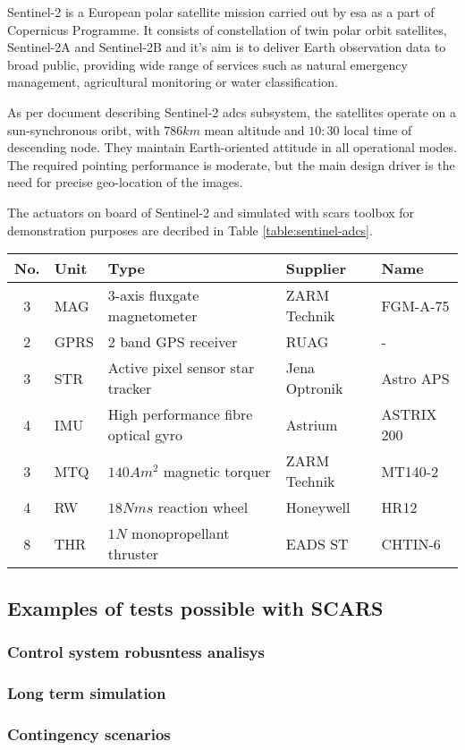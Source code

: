     Sentinel-2 is a European polar satellite mission carried out by \ac{esa} as a part of Copernicus Programme. It consists of constellation of twin polar orbit satellites, Sentinel-2A and Sentinel-2B and it's aim is to deliver Earth observation data to broad public, providing wide range of services such as natural emergency management, agricultural monitoring or water classification. \cite{sentinelreference_description}

    As per document describing Sentinel-2 \ac{adcs} subsystem, the satellites operate on a sun-synchronous oribt, with $786km$ mean altitude and $10:30$ local time of descending node. They maintain Earth-oriented attitude in all operational modes. The required pointing performance is moderate, but the main design driver is the need for precise geo-location of the images. \cite{sentinelreference_adcs}

    The actuators on board of Sentinel-2 and simulated with \ac{scars} toolbox for demonstration purposes are decribed in Table \ref{table:sentinel-adcs}.

        
    \begin{center}    
        \begin{tabular}{ c l l l l }
            \textbf{No.} & \textbf{Uni}t & \textbf{Type} & \textbf{Supplier} & \textbf{Name} \\ \hline
            3 & MAG & 3-axis fluxgate magnetometer & ZARM Technik & FGM-A-75 \\
            2 & GPRS & 2 band GPS receiver & RUAG & - \\
            3 & STR  & Active pixel sensor star tracker & Jena Optronik & Astro APS \\
            4 & IMU & High performance fibre optical gyro & Astrium & ASTRIX 200 \\
            3 & MTQ & $140 Am^2$ magnetic torquer & ZARM Technik & MT140-2\\
            4 & RW & $18 Nms$ reaction wheel & Honeywell & HR12 \\
            8 & THR & $1N$ monopropellant thruster & EADS ST &CHTIN-6
        \end{tabular}
    \end{center}\label{table:sentinel-adcs}

\subsection{Examples of tests possible with SCARS}

\subsubsection{Control system robusntess analisys}

\subsubsection{Long term simulation}

\subsubsection{Contingency scenarios}
